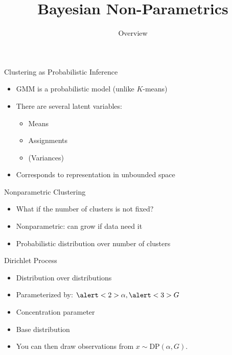 \documentclass[compress]{beamer}
\title{Bayesian Non-Parametrics}
\date{Overview}
\begin{document}
\frame{\titlepage
}


\begin{frame}{Clustering as Probabilistic Inference}
	\begin{itemize}
		\item GMM is a probabilistic model (unlike $K$-means)
		\item There are several latent variables:
		\begin{itemize}
			\item Means
			\item Assignments
			\item (Variances)
		\end{itemize}
		\pause
		\item Corresponds to representation in unbounded space
	\end{itemize}
\end{frame}

\begin{frame}{Nonparametric Clustering}

	\begin{itemize}
		\item What if the number of clusters is not fixed?
		\item Nonparametric: can grow if data need it
		\item Probabilistic distribution over number of clusters
	\end{itemize}

\end{frame}



\begin{frame}{Dirichlet Process}

\begin{itemize}
	\item Distribution over distributions
	\item Parameterized by: $\alert<2>{\alpha}, \alert<3>{G}$
	\item<2-> Concentration parameter
	\item<3-> Base distribution
	\item<4-> You can then draw observations from $x \sim $DP$(\alpha, G)$.
\end{itemize}

\end{frame}
\end{document}
